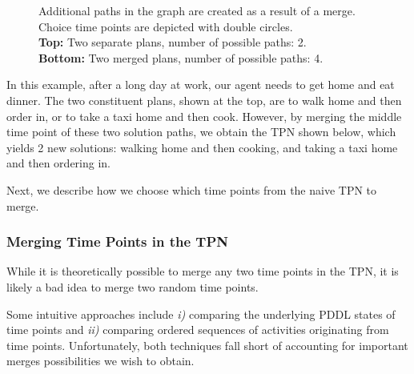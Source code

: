 \begin{figure}
\begin{minipage}[t]{0.5\textwidth}
    \end{minipage}
    \caption{Additional paths in the graph are created as a result of a merge. Choice time points are depicted with double circles.\\
    \textbf{Top:} Two separate plans, number of possible paths: 2. \\
    \textbf{Bottom:} Two merged plans, number of possible paths: 4.}
    \label{fig:add_plans_from_merge}
    \vspace{-4mm}
\end{figure}




In this example, after a long day at work, our agent needs to get home and eat dinner. The two constituent plans, shown at the top, are to walk home and then order in, or to take a taxi home and then cook. However, by merging the middle time point of these two solution paths, we obtain the TPN shown below, which yields 2 new solutions: walking home and then cooking, and taking a taxi home and then ordering in.


Next, we describe how we choose which time points from the naive TPN to merge.


\subsubsection{Merging Time Points in the TPN}
While it is theoretically possible to merge any two time points in the TPN, it is likely a bad idea to merge two random time points. 

Some intuitive approaches include \textit{i)} comparing the underlying PDDL states of time points and \textit{ii)} comparing ordered sequences of activities originating from time points. Unfortunately, both techniques fall short of accounting for important merges possibilities we wish to obtain. 


